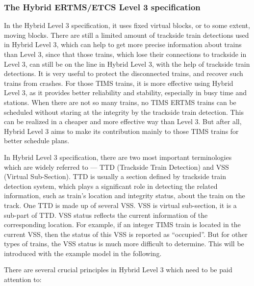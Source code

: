 \documentclass[article,dr=phil,type=msc,colorback,accentcolor=tud9c]{tudthesis}
\begin{document}
  \subsubsection{The Hybrid ERTMS/ETCS Level 3 specification} 
  
  In the Hybrid Level 3 specification, it uses fixed virtual blocks, or to some extent, moving blocks. There are still a limited amount of trackside train detections used in Hybrid Level 3, which can help to get more precise information about trains than Level 3, since that those trains, which lose their connections to trackside in Level 3, can still be on the line in Hybrid Level 3, with the help of trackside train detections. It is very useful to protect the disconnected trains, and recover such trains from crashes. For those TIMS trains, it is more effective using Hybrid Level 3, as it provides better reliability and stability, especially in busy time and stations. When there are not so many trains, no TIMS ERTMS trains can be scheduled without staring at the integrity by the trackside train detection. This can be realized in a cheaper and more effective way than Level 3. But after all, Hybrid Level 3 aims to make its contribution mainly to those TIMS trains for better schedule plans.\cite{hybridl3}
  
  In Hybrid Level 3 specification, there are two most important terminologies which are widely referred to --- TTD (Trackside Train Detection) and VSS (Virtual Sub-Section). TTD is usually a section defined by trackside train detection system, which plays a significant role in detecting the related information, such as train’s location and integrity status, about the train on the track. One TTD is made up of several VSS. VSS is virtual sub-section, it is a sub-part of TTD. VSS status reflects the current information of the corresponding location. For example, if an integer TIMS train is located in the current VSS, then the status of this VSS is reported as “occupied”. But for other types of trains, the VSS status is much more difficult to determine. This will be introduced with the example model in the following.

  There are several crucial principles in Hybrid Level 3 which need to be paid attention to:
\end{document}
